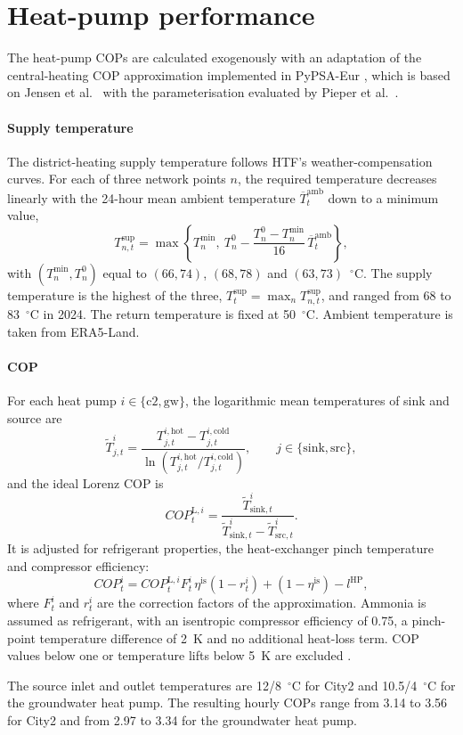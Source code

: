 \section{Heat-pump performance}
\label{app:cop}

The heat-pump COPs are calculated exogenously with an adaptation of the central-heating COP approximation implemented in PyPSA-Eur \cite{pypsaeur2025}, which is based on Jensen et al.\ \cite{jensen2018cop} with the parameterisation evaluated by Pieper et al.\ \cite{pieper2020cop}.

\paragraph{Supply temperature}
The district-heating supply temperature follows HTF's weather-compensation curves. For each of three network points $n$, the required temperature decreases linearly with the 24-hour mean ambient temperature $\overline{T}^{\mathrm{amb}}_t$ down to a minimum value,
\begin{equation}
    T^{\mathrm{sup}}_{n,t} = \max\left\{T^{\min}_n,\ T^{0}_n - \frac{T^{0}_n - T^{\min}_n}{16}\,\overline{T}^{\mathrm{amb}}_t\right\},
\end{equation}
with $(T^{\min}_n, T^{0}_n)$ equal to $(66, 74)$, $(68, 78)$ and $(63, 73)$~$^\circ$C. The supply temperature is the highest of the three, $T^{\mathrm{sup}}_t=\max_n T^{\mathrm{sup}}_{n,t}$, and ranged from 68 to 83~$^\circ$C in 2024. The return temperature is fixed at 50~$^\circ$C. Ambient temperature is taken from ERA5-Land.

\paragraph{COP}
For each heat pump $i\in\{\mathrm{c2},\mathrm{gw}\}$, the logarithmic mean temperatures of sink and source are
\begin{equation}
    \widetilde{T}^{i}_{j,t}
    = \frac{T^{i,\mathrm{hot}}_{j,t} - T^{i,\mathrm{cold}}_{j,t}}
           {\ln\left(T^{i,\mathrm{hot}}_{j,t}/T^{i,\mathrm{cold}}_{j,t}\right)},
    \qquad j\in\{\mathrm{sink},\mathrm{src}\},
\end{equation}
and the ideal Lorenz COP is
\begin{equation}
    COP^{\mathrm{L},i}_{t} = \frac{\widetilde{T}^{i}_{\mathrm{sink},t}}{\widetilde{T}^{i}_{\mathrm{sink},t} - \widetilde{T}^{i}_{\mathrm{src},t}}.
\end{equation}
It is adjusted for refrigerant properties, the heat-exchanger pinch temperature and compressor efficiency:
\begin{equation}
    COP^{i}_{t} = COP^{\mathrm{L},i}_{t} F^{i}_{t}\,\eta^{\mathrm{is}}\left(1-r^{i}_{t}\right) + \left(1-\eta^{\mathrm{is}}\right) - l^{\mathrm{HP}},
\end{equation}
where $F^{i}_{t}$ and $r^{i}_{t}$ are the correction factors of the approximation. Ammonia is assumed as refrigerant, with an isentropic compressor efficiency of 0.75, a pinch-point temperature difference of 2~K and no additional heat-loss term. COP values below one or temperature lifts below 5~K are excluded \cite{zajacs2020lowtemperature}.

The source inlet and outlet temperatures are 12/8~$^\circ$C for City2 and 10.5/4~$^\circ$C for the groundwater heat pump. The resulting hourly COPs range from 3.14 to 3.56 for City2 and from 2.97 to 3.34 for the groundwater heat pump.
